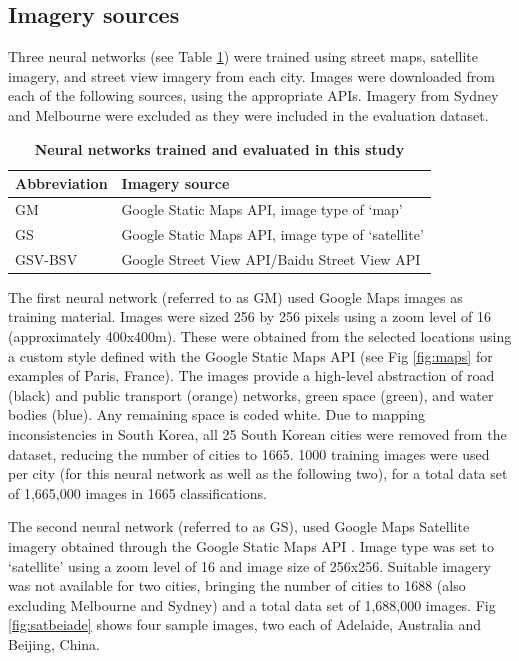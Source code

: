 \documentclass[10pt,letterpaper]{article}
\begin{document}
\label{methodsimagery}
\subsection*{Imagery sources}

Three neural networks (see Table \ref{tab:neuralnetworks}) were trained using street maps, satellite imagery, and street view imagery from each city. Images were downloaded from each of the following sources, using the appropriate APIs. Imagery from Sydney and Melbourne were excluded as they were included in the evaluation dataset. 


\begin{table}[!htbp]
\caption{\bf Neural networks trained and evaluated in this study \label{tab:neuralnetworks}}     
\begin{tabular}{ l l }
 \hline Abbreviation   &  Imagery source \\ \hline
GM & Google Static Maps API, image type of `map'     \\ 
GS & Google Static Maps API, image type of `satellite'      \\
GSV-BSV & Google Street View API/Baidu Street View API     \\ \hline

\end{tabular}
\end{table}

The first neural network (referred to as GM) used Google Maps images as training material. Images were sized 256 by 256 pixels using a zoom level of 16 (approximately 400x400m). These were obtained from the selected locations using a custom style defined with the Google Static Maps API \cite{GoogleStatic2017} (see Fig \ref{fig:maps} for examples of Paris, France). The images provide a high-level abstraction of road (black) and public transport (orange) networks, green space (green), and water bodies (blue). Any remaining space is coded white. Due to mapping inconsistencies in South Korea, all 25 South Korean cities were removed from the dataset, reducing the number of cities to 1665. 1000 training images were used per city (for this neural network as well as the following two), for a total data set of 1,665,000 images in 1665 classifications. 

The second neural network (referred to as GS), used Google Maps Satellite imagery obtained through the Google Static Maps API \cite{GoogleStatic2017}. Image type was set to `satellite' using a zoom level of 16 and image size of 256x256. Suitable imagery was not available for two cities, bringing the number of cities to 1688 (also excluding Melbourne and Sydney) and a total data set of 1,688,000 images. Fig \ref{fig:satbeiade} shows four sample images, two each of Adelaide, Australia and Beijing, China. 
\end{document}

